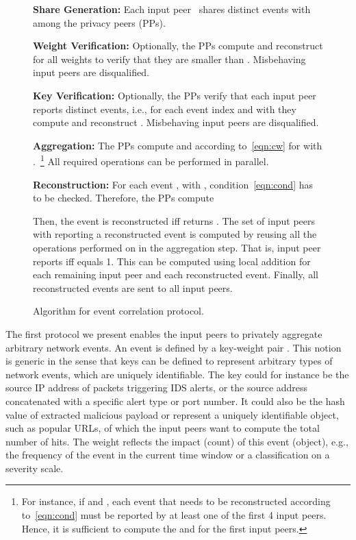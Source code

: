 \documentclass[letterpaper,11pt,onecolumn,titlepage]{article}
\begin{document}
\begin{figure*}[t]
	\begin{boxedminipage}{\textwidth}
		\begin{small}
		\begin{compactenum}
		
		\item \textbf{Share Generation:} Each input peer~ shares  distinct events  with  among the privacy peers (PPs).
		
		\item \textbf{Weight Verification:} Optionally, the PPs compute and reconstruct  for all weights to verify that they are smaller  than . Misbehaving input peers are disqualified.
		
		\item \textbf{Key Verification:} Optionally, the PPs verify that each input peer  reports distinct events, i.e., for each event index  and  with  they compute and reconstruct . Misbehaving input peers are disqualified.
		
		\item \textbf{Aggregation:} The PPs compute  and  according to~\eqref{eqn:cw} for  with .~\footnote{For instance, if  and , each event that needs to be reconstructed according to~\eqref{eqn:cond} must be reported by at least one of the first 4 input peers. Hence, it is sufficient to compute the  and  for the first  input peers.} All required  operations can be performed in parallel.
		\item \textbf{Reconstruction:} For each event , with , condition~\eqref{eqn:cond} has to be checked. Therefore, the PPs compute
		
		Then, the event is reconstructed iff  returns . 
		The set of input peers with  reporting a reconstructed event  is computed by reusing all the  operations performed on  in the aggregation step. That is, input peer  reports  iff  equals 1. This can be computed using local addition for each remaining input peer and each reconstructed event. Finally, all reconstructed events are sent to all input peers.
		\end{compactenum}
		\end{small}
	\end{boxedminipage}
	\caption{Algorithm for event correlation protocol.}
	\label{box:eventcorrelation}
\end{figure*}


The first protocol we present enables the input peers to privately aggregate arbitrary network events.
An event  is defined by a key-weight pair . This notion is generic in the sense that keys can be defined to represent arbitrary types of network events, which are uniquely identifiable. The key  could for instance be the source IP address of packets triggering IDS alerts, or the source address concatenated with a specific alert type or port number. It could also be the hash value of extracted malicious payload or represent a uniquely identifiable object, such as popular URLs, of which the input peers want to compute the total number of hits. The weight  reflects the impact (count) of this event (object), e.g., the frequency of the event in the current time window or a classification on a severity scale.
\end{document}
